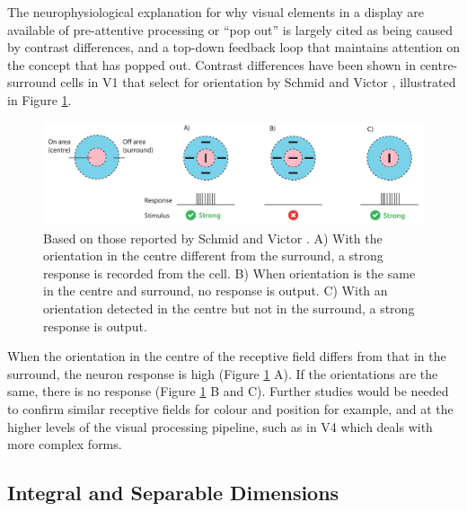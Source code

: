 The neurophysiological explanation for why visual elements in a display are available of pre-attentive processing or ``pop out'' is largely cited as being caused by contrast differences, and a top-down feedback loop that maintains attention on the concept that has popped out.
Contrast differences have been shown in centre-surround cells in V1 that select for orientation by Schmid and Victor \cite{Schmid2014}, illustrated in Figure \ref{fig:orientation_rf}.

\begin{figure}[t!]
\centering
\includegraphics[width=\textwidth]{images/related-work/orientation_rf.pdf}
\caption{Based on those reported by Schmid and Victor \cite{Schmid2014}. A) With the orientation in the centre different from the surround, a strong response is recorded from the cell.
B) When orientation is the same in the centre and surround, no response is output. C) With an orientation detected in the centre but not in the surround, a strong response is output.} 
\label{fig:orientation_rf}
\end{figure}

When the orientation in the centre of the receptive field differs from that in the surround, the neuron response is high (Figure \ref{fig:orientation_rf} A).
If the orientations are the same, there is no response (Figure \ref{fig:orientation_rf} B and C).
Further studies would be needed to confirm similar receptive fields for colour and position for example, and at the higher levels of the visual processing pipeline, such as in V4 which deals with more complex forms.


\subsection{Integral and Separable Dimensions}
\label{sec:channel-composition}

